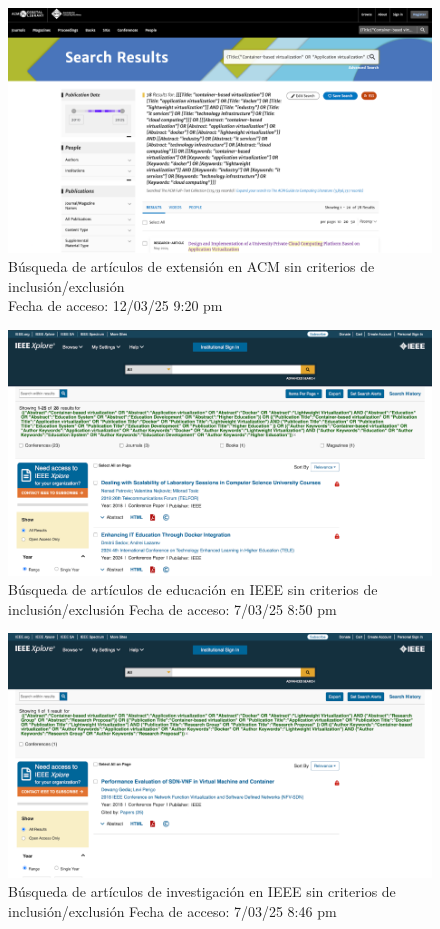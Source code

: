 \FloatBarrier\begin{figure}[H]
	\centering
	\includegraphics[width=\textwidth,keepaspectratio]{apendices/BD/sin-criterios/ACM-ind.png}
	\caption{Búsqueda de artículos de extensión en ACM sin criterios de inclusión/exclusión \\
		Fecha de acceso: 12/03/25 9:20 pm
	}\label{fig:busqueda3}
\end{figure}
\FloatBarrier\begin{figure}[H]
	\centering
	\includegraphics[width=\textwidth,keepaspectratio]{apendices/BD/sin-criterios/IEEE-ed.png}
	\caption{Búsqueda de artículos de educación en IEEE sin criterios de inclusión/exclusión
		Fecha de acceso: 7/03/25 8:50 pm
	}\label{fig:busqueda4}
\end{figure}
\FloatBarrier\begin{figure}[H]
	\centering
	\includegraphics[width=\textwidth,keepaspectratio]{apendices/BD/sin-criterios/IEEE-inv.png}
	\caption{Búsqueda de artículos de investigación en IEEE sin criterios de inclusión/exclusión
		Fecha de acceso: 7/03/25 8:46 pm
	}\label{fig:busqueda5}
\end{figure}
